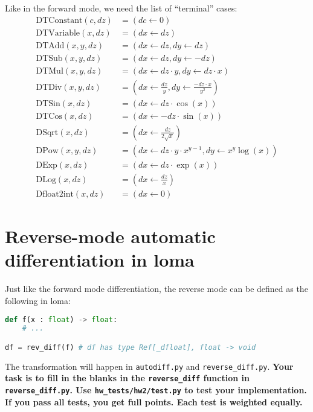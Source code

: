 Like in the forward mode, we need the list of ``terminal'' cases:
\begin{equation}
\begin{aligned}
\text{DTConstant}(c, dz) &= \left(dc \leftarrow 0\right) \\
\text{DTVariable}(x, dz) &= \left(dx \leftarrow dz\right) \\
\text{DTAdd}(x, y, dz) &= \left(dx \leftarrow dz, dy \leftarrow dz\right) \\
\text{DTSub}(x, y, dz) &= \left(dx \leftarrow dz, dy \leftarrow -dz\right) \\
\text{DTMul}(x, y, dz) &= \left(dx \leftarrow dz \cdot y, dy \leftarrow dz \cdot x\right) \\
\text{DTDiv}(x, y, dz) &= \left(dx \leftarrow \frac{dz}{y}, dy \leftarrow \frac{-dz \cdot x}{y^2}\right) \\
\text{DTSin}(x, dz) &= \left(dx \leftarrow dz \cdot \cos(x)\right) \\
\text{DTCos}(x, dz) &= \left(dx \leftarrow -dz \cdot \sin(x)\right) \\
\text{DSqrt}(x, dz) &= \left(dx \leftarrow \frac{dz}{2\sqrt{x}} \right) \\
\text{DPow}(x, y, dz) &= \left(dx \leftarrow dz \cdot y \cdot x^{y-1}, dy \leftarrow x^y \log(x) \right) \\
\text{DExp}(x, dz) &= \left(dx \leftarrow dz \cdot \exp(x) \right) \\
\text{DLog}(x, dz) &= \left(dx \leftarrow \frac{dz}{x} \right) \\
\text{Dfloat2int}(x, dz) &= \left(dx \leftarrow 0\right)
\end{aligned}
\end{equation}

\section{Reverse-mode automatic differentiation in loma}

Just like the forward mode differentiation, the reverse mode can be defined as the following in loma:
\begin{lstlisting}[language=Python]
def f(x : float) -> float:
	# ...

df = rev_diff(f) # df has type Ref[_dfloat], float -> void
\end{lstlisting}

The transformation will happen in \lstinline{autodiff.py} and \lstinline{reverse_diff.py}. \textbf{Your task is to fill in the blanks in the \lstinline{reverse_diff} function in \lstinline{reverse_diff.py}. Use \lstinline{hw_tests/hw2/test.py} to test your implementation. If you pass all tests, you get full points. Each test is weighted equally.}

